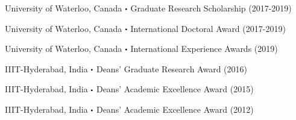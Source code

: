 \datedsubsectionnarrow{}
{%
	University of Waterloo, Canada}
{%
	$\sbullet$ Graduate Research Scholarship (2017-2019)}
{}

\datedsubsectionnarrow{}
{%
	University of Waterloo, Canada}
{%
	$\sbullet$ International Doctoral Award (2017-2019)}
{}

\datedsubsectionnarrow{}
{%
	University of Waterloo, Canada}
{%
	$\sbullet$ International Experience Awards (2019)}
{}

\datedsubsectionnarrow{}
{%
	IIIT-Hyderabad, India}
{%
	$\sbullet$ Deans' Graduate Research Award (2016)}
{}

\datedsubsectionnarrow{}
{%
	IIIT-Hyderabad, India}
{%
	$\sbullet$ Deans' Academic Excellence Award (2015)}
{}

\datedsubsectionnarrow{}
{%
	IIIT-Hyderabad, India}
{%
	$\sbullet$ Deans' Academic Excellence Award (2012)}
{}

